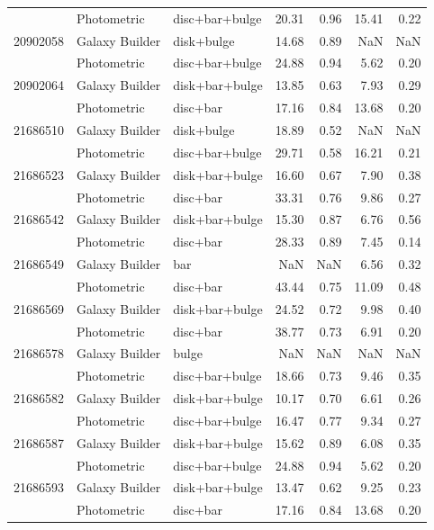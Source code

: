 \documentclass[../main.tex]{subfiles}
\begin{document}
\begin{table}
\begin{tabular}{lllrrrr}
           & Photometric    &  disc+bar+bulge &    20.31 &     0.96 &   15.41 &    0.22 \\
  20902058 & Galaxy Builder &      disk+bulge &    14.68 &     0.89 &     NaN &     NaN \\
           & Photometric    &  disc+bar+bulge &    24.88 &     0.94 &    5.62 &    0.20 \\
  20902064 & Galaxy Builder &  disk+bar+bulge &    13.85 &     0.63 &    7.93 &    0.29 \\
           & Photometric    &        disc+bar &    17.16 &     0.84 &   13.68 &    0.20 \\
  21686510 & Galaxy Builder &      disk+bulge &    18.89 &     0.52 &     NaN &     NaN \\
           & Photometric    &  disc+bar+bulge &    29.71 &     0.58 &   16.21 &    0.21 \\
  21686523 & Galaxy Builder &  disk+bar+bulge &    16.60 &     0.67 &    7.90 &    0.38 \\
           & Photometric    &        disc+bar &    33.31 &     0.76 &    9.86 &    0.27 \\
  21686542 & Galaxy Builder &  disk+bar+bulge &    15.30 &     0.87 &    6.76 &    0.56 \\
           & Photometric    &        disc+bar &    28.33 &     0.89 &    7.45 &    0.14 \\
  21686549 & Galaxy Builder &             bar &      NaN &      NaN &    6.56 &    0.32 \\
           & Photometric    &        disc+bar &    43.44 &     0.75 &   11.09 &    0.48 \\
  21686569 & Galaxy Builder &  disk+bar+bulge &    24.52 &     0.72 &    9.98 &    0.40 \\
           & Photometric    &        disc+bar &    38.77 &     0.73 &    6.91 &    0.20 \\
  21686578 & Galaxy Builder &           bulge &      NaN &      NaN &     NaN &     NaN \\
           & Photometric    &  disc+bar+bulge &    18.66 &     0.73 &    9.46 &    0.35 \\
  21686582 & Galaxy Builder &  disk+bar+bulge &    10.17 &     0.70 &    6.61 &    0.26 \\
           & Photometric    &  disc+bar+bulge &    16.47 &     0.77 &    9.34 &    0.27 \\
  21686587 & Galaxy Builder &  disk+bar+bulge &    15.62 &     0.89 &    6.08 &    0.35 \\
           & Photometric    &  disc+bar+bulge &    24.88 &     0.94 &    5.62 &    0.20 \\
  21686593 & Galaxy Builder &  disk+bar+bulge &    13.47 &     0.62 &    9.25 &    0.23 \\
           & Photometric    &        disc+bar &    17.16 &     0.84 &   13.68 &    0.20 \\
  \hline
  \end{tabular}
\end{table}
\end{document}
